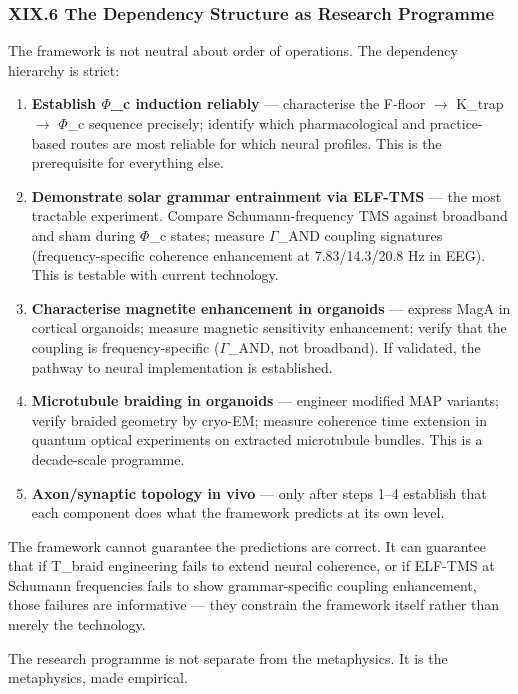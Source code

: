 \documentclass[12pt,a4paper]{article}
\begin{document}
\subsubsection{XIX.6 The Dependency Structure as Research Programme}

The framework is not neutral about order of operations. The dependency hierarchy is strict:

\begin{enumerate}
    \item \textbf{Establish $\Phi$\_c induction reliably} --- characterise the F-floor $\rightarrow$ K\_trap $\rightarrow$ $\Phi$\_c sequence precisely; identify which pharmacological and practice-based routes are most reliable for which neural profiles. This is the prerequisite for everything else.
    \item \textbf{Demonstrate solar grammar entrainment via ELF-TMS} --- the most tractable experiment. Compare Schumann-frequency TMS against broadband and sham during $\Phi$\_c states; measure $\Gamma$\_AND coupling signatures (frequency-specific coherence enhancement at 7.83/14.3/20.8 Hz in EEG). This is testable with current technology.
    \item \textbf{Characterise magnetite enhancement in organoids} --- express MagA in cortical organoids; measure magnetic sensitivity enhancement; verify that the coupling is frequency-specific ($\Gamma$\_AND, not broadband). If validated, the pathway to neural implementation is established.
    \item \textbf{Microtubule braiding in organoids} --- engineer modified MAP variants; verify braided geometry by cryo-EM; measure coherence time extension in quantum optical experiments on extracted microtubule bundles. This is a decade-scale programme.
    \item \textbf{Axon/synaptic topology in vivo} --- only after steps 1--4 establish that each component does what the framework predicts at its own level.
\end{enumerate}

The framework cannot guarantee the predictions are correct. It can guarantee that if T\_braid engineering fails to extend neural coherence, or if ELF-TMS at Schumann frequencies fails to show grammar-specific coupling enhancement, those failures are informative --- they constrain the framework itself rather than merely the technology.

The research programme is not separate from the metaphysics. It is the metaphysics, made empirical.
\end{document}
